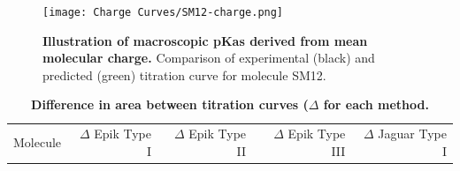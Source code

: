 \documentclass[9pt,lineno]{elife}
\begin{document}
\begin{figure}[H]
    \centering
    \texttt{[image: Charge Curves/SM12-charge.png]}
    \caption{{\bf Illustration of macroscopic pKas derived from mean molecular charge.}
    Comparison of experimental (black) and predicted (green) titration curve for molecule SM12.}
    \label{fig:charge-curves}
\end{figure}

\begin{table}[H]
    \centering
    \caption{{\bf Difference in area between titration curves ($\Delta$ for each method.} }
    \label{tab:titration_curves}
    \begin{tabular}{lrrrr}
\toprule
Molecule &  $\Delta$ Epik Type I &  $\Delta$ Epik Type II &  $\Delta$ Epik Type III &  $\Delta$ Jaguar Type I \\


\end{tabular}
\end{table}
\end{document}
